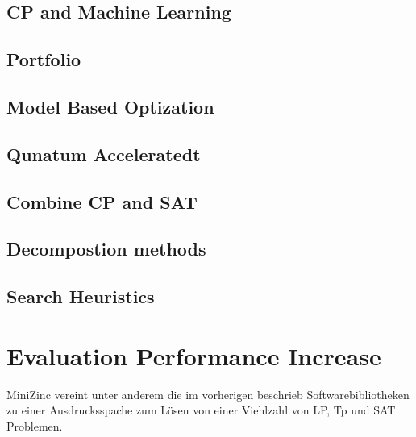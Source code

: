 \subsection{CP and Machine Learning}
\label{sec:CP and Machine Learning}

  
\subsection{Portfolio}
\label{sec:Portfolio}

  
\subsection{Model Based Optization}
\label{sec:Model Based Optization}

  
\subsection{Qunatum Acceleratedt}
\label{sec:Qunatum Accelerated}

  
\subsection{Combine CP and SAT}
\label{sec:Combine CP and SAT}

  
\subsection{Decompostion methods}
\label{sec:Decompostion methods}

  
\subsection{Search Heuristics}
\label{sec:Search Heuristics}


\section{Evaluation Performance Increase}
\label{sec:Evaluation Performance Increase}

MiniZinc vereint unter anderem die im vorherigen beschrieb
Softwarebibliotheken zu einer Ausdrucksspache zum Lösen von einer Viehlzahl von 
LP, Tp und SAT Problemen. \cite{MiniZwe}




\printbibliography[heading=bibintoc]





